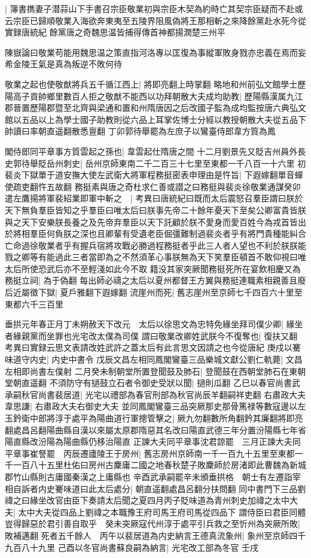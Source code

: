 |{
	簿書擕妻子潜蒜山下手書召宗臣敬業初與宗臣木契為約時亡其契宗臣疑而不赴或云宗臣已歸順敬業入海欲奔東夷至五陵界阻風偽將王那相斬之來降餘黨赴水死今從實録唐統紀}
餘黨唐之奇魏思温皆捕得傳首神都揚潤楚三州平

陳嶽論曰敬業苟能用魏思温之策直指河洛專以匡復為事縱軍敗身戮亦忠義在焉而妄希金陵王氣是真為叛逆不敗何待

敬業之起也使敬猷將兵五千循江西上|{
	將即亮翻上時掌翻}
略地和州前弘文館學士歷陽高子貢帥鄉里數百人拒之敬猷不能西以功拜朝散大夫成均助教|{
	歷陽縣漢属九江郡晉置歷陽郡暨至北齊與梁通和置和州隋唐因之后改國子監為成均監按唐六典弘文館以五品以上為學士國子助教則從六品上耳掌佐博士分經以教授朝散大夫從五品下帥讀曰率朝直遥翻散悉亶翻}
丁卯郭待舉罷為左庶子以鸞臺侍郎韋方質為鳳

閣侍郎同平章事方質雲起之孫也|{
	韋雲起仕隋唐之間}
十二月劉景先又貶吉州員外長史郭待舉貶岳州刺史|{
	岳州京師東南二千二百三十七里至東都一千八百一十六里}
初裴炎下獄單于道安撫大使左武衛大將軍程務挺密表申理由是忤旨|{
	下遐嫁翻單音蟬使疏吏翻忤五故翻}
務挺素與唐之奇杜求仁善或譛之曰務挺與裴炎徐敬業通謀癸卯遣左鷹揚將軍裴紹業即軍中斬之　|{
	考異曰唐統紀曰既而太后震怒召羣臣謂曰朕於天下無負羣臣皆知之乎羣臣曰唯太后曰朕事先帝二十餘年憂天下至矣公卿富貴皆朕與之天下安樂朕長養之及先帝弃羣臣以天下託顧於朕不愛身而愛百姓今為戎首皆出於將相羣臣何負朕之深也且卿輩有受遺老臣倔彊難制過裴炎者乎有將門貴種能糾合亡命過徐敬業者乎有握兵宿將攻戰必勝過程務挺者乎此三人者人望也不利於朕朕能戮之卿等有能過此三者當即為之不然須革心事朕無為天下笑羣臣頓首不敢仰視曰唯太后所使恐武后亦不至輕淺如此今不取}
籍没其家突厥聞務挺死所在宴飲相慶又為務挺立祠|{
	為于偽翻}
每出師必禱之太后以夏州都督王方翼與務挺連職素相親善且廢后近屬徵下獄|{
	夏戶雅翻下遐嫁翻}
流崖州而死|{
	舊志崖州至京師七千四百六十里至東都六千三百里}


垂拱元年春正月丁未朔赦天下改元　太后以徐思文為忠特免緣坐拜司僕少卿|{
	緣坐者緣親黨而坐罪也光宅改太僕為司僕}
謂曰敬業改卿姓武朕今不復奪也|{
	復扶又翻　考異曰實録云思文表請改姓武許之蓋太后有此言思文因請之也今從唐紀}
庚戍以騫味道守内史|{
	内史中書令}
戊辰文昌左相同鳳閣鸞臺三品樂城文獻公劉仁軌薨|{
	文昌左相即尚書左僕射}
二月癸未制朝堂所置登聞鼓及肺石|{
	登聞鼓在西朝堂肺石在東朝堂朝直遥翻}
不須防守有撾鼓立石者令御史受狀以聞|{
	撾則瓜翻}
乙巳以春官尚書武承嗣秋官尚書裴居道|{
	光宅以禮部為春官刑部為秋官尚辰羊翻嗣祥吏翻}
右肅政大夫韋思謙|{
	右肅政大夫右御史大夫}
並同鳳閣鸞臺三品突厥那史那骨篤禄等數寇邊以左玉鈐衛中郎將淳于處平為陽曲道行軍摠管擊之|{
	厥九勿翻數所角翻鈐其廉翻將即亮翻處昌呂翻陽曲縣自漢以來屬太原郡隋惡其名改曰陽直武德三年分置汾陽縣七年省陽直縣改汾陽為陽曲縣仍移治陽直}
正諫大夫同平章事沈君諒罷　三月正諫大夫同平章事崔詧罷　丙辰遷廬陵王于房州|{
	舊志房州京師南一千一百九十五里至東都一千一百八十五里杜佑曰房州古麇庸二國之地春秋楚子敗麇師於房渚即此曹魏為新城郡竹山縣則古庸國秦漢之上庸縣也}
辛酉武承嗣罷辛未頒垂拱格　朝士有左遷詣宰相自訴者内史騫味道曰此太后處分|{
	朝直遥翻處昌呂翻分扶問翻}
同中書門下三品劉禕之曰緣坐改官由臣下奏請太后聞之夏四月丙子貶味道為青州刺史加禕之太中大夫|{
	太中大夫從四品上劉禕之本職豫王府司馬王府司馬從四品下}
謂侍臣曰君臣同體豈得歸惡於君引善自取乎　癸未突厥寇代州淳于處平引兵救之至忻州為突厥所敗|{
	敗補邁翻}
死者五千餘人　丙午以裴居道為内史納言王德真流象州|{
	象州至京師四千九百八十九里}
己酉以冬官尚書蘇良嗣為納言|{
	光宅改工部為冬官}
壬戌

